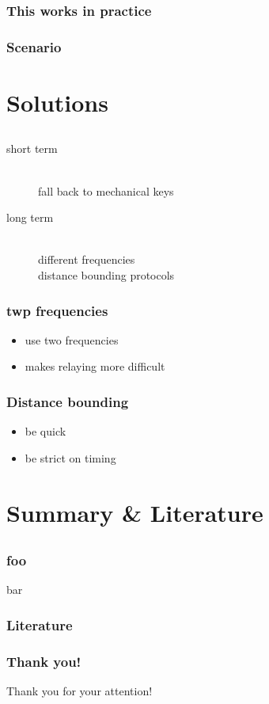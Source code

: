 \documentclass[12pt]{beamer}
\begin{document}
	\begin{frame}
		\frametitle{This works in practice}
	\end{frame}

	\begin{frame}
		\frametitle{Scenario}
	\end{frame}

\section{Solutions}
\subsection*{}
	\begin{frame}
		\frametitle{}
		\begin{description}
			\item[short term] \hfill \\
				fall back to mechanical keys
			\item[long term] \hfill \\
					different frequencies \\
					distance bounding protocols
		\end{description}
	\end{frame}

	\begin{frame}
		\frametitle{twp frequencies}
			\begin{itemize}
				\item use two frequencies
				\item makes relaying more difficult %
			\end{itemize}
	\end{frame}

	\begin{frame}
		\frametitle{Distance bounding}
			\begin{itemize}
				\item be quick
				\item be strict on timing
			\end{itemize}
	\end{frame}

\section{Summary \& Literature}
\subsection*{}
	\begin{frame}
		\frametitle{foo}
		bar
	\end{frame}
	\begin{frame}
	\frametitle{Literature}
	\tiny
	\nocite{*}
		\def\newblock{}
		
		
	\end{frame}

	\begin{frame}
		\frametitle{Thank you!}
		\begin{center}
			Thank you for your attention!
		\end{center}
	\end{frame}	
\end{document}
